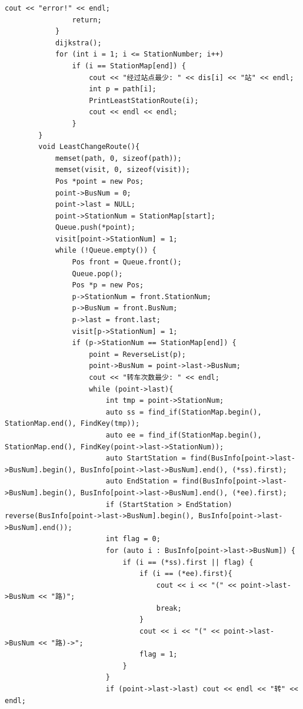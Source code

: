 \documentclass[a4paper,11pt,UTF8]{ctexart}
\begin{document}
\begin{lstlisting}[caption=BusRoute.cpp,captionpos=b]
                cout << "error!" << endl;
                return;
            }
            dijkstra();
            for (int i = 1; i <= StationNumber; i++)
                if (i == StationMap[end]) {
                    cout << "经过站点最少: " << dis[i] << "站" << endl;
                    int p = path[i];
                    PrintLeastStationRoute(i);
                    cout << endl << endl;
                }
        }
        void LeastChangeRoute(){
            memset(path, 0, sizeof(path));
            memset(visit, 0, sizeof(visit));
            Pos *point = new Pos;
            point->BusNum = 0;
            point->last = NULL;
            point->StationNum = StationMap[start];
            Queue.push(*point);
            visit[point->StationNum] = 1;
            while (!Queue.empty()) {
                Pos front = Queue.front();
                Queue.pop();
                Pos *p = new Pos;
                p->StationNum = front.StationNum;
                p->BusNum = front.BusNum;
                p->last = front.last;
                visit[p->StationNum] = 1;
                if (p->StationNum == StationMap[end]) {
                    point = ReverseList(p);
                    point->BusNum = point->last->BusNum;
                    cout << "转车次数最少: " << endl;
                    while (point->last){
                        int tmp = point->StationNum;
                        auto ss = find_if(StationMap.begin(), StationMap.end(), FindKey(tmp));
                        auto ee = find_if(StationMap.begin(), StationMap.end(), FindKey(point->last->StationNum));
                        auto StartStation = find(BusInfo[point->last->BusNum].begin(), BusInfo[point->last->BusNum].end(), (*ss).first);
                        auto EndStation = find(BusInfo[point->last->BusNum].begin(), BusInfo[point->last->BusNum].end(), (*ee).first);
                        if (StartStation > EndStation) reverse(BusInfo[point->last->BusNum].begin(), BusInfo[point->last->BusNum].end());
                        int flag = 0;
                        for (auto i : BusInfo[point->last->BusNum]) {
                            if (i == (*ss).first || flag) {
                                if (i == (*ee).first){
                                    cout << i << "(" << point->last->BusNum << "路)";
                                    break;
                                }
                                cout << i << "(" << point->last->BusNum << "路)->";
                                flag = 1;
                            }
                        }
                        if (point->last->last) cout << endl << "转" << endl;

\end{lstlisting}
\end{document}

